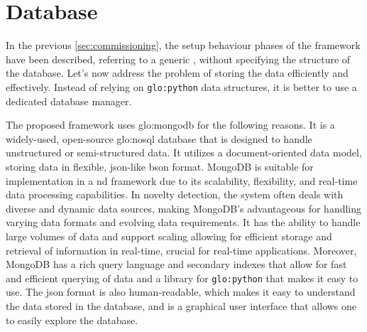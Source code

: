 
\section{Database}
\label{sec:Database}
In the previous \autoref{sec:commissioning}, the setup behaviour phases of the framework have been described, referring to a generic , without specifying the structure of the database. Let's now address the problem of storing the data efficiently and effectively. Instead of relying on \texttt{\gls{glo:python}} data structures, it is better to use a dedicated database manager.

The proposed framework uses \gls{glo:mongodb} for the following reasons. It is a widely-used, open-source \gls{glo:nosql} database that is designed to handle unstructured or semi-structured data. It utilizes a document-oriented data model, storing data in flexible, \gls{json}-like \gls{bson} format. MongoDB is suitable for implementation in a \gls{nd} framework due to its scalability, flexibility, and real-time data processing capabilities. In novelty detection, the system often deals with diverse and dynamic data sources, making MongoDB's  advantageous for handling varying data formats and evolving data requirements. It has the ability to handle large volumes of data and support scaling allowing for efficient storage and retrieval of information in real-time, crucial for real-time applications. Moreover, MongoDB has a rich query language and secondary indexes that allow for fast and efficient querying of data and a library for \texttt{\gls{glo:python}} that makes it easy to use.
The \gls{json} format is also human-readable, which makes it easy to understand the data stored in the database, and  is a graphical user interface that allows one to easily explore the database.

